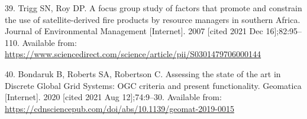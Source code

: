 \documentclass{josis}
\newlength{\cslhangindent}
\newenvironment{CSLReferences}[2] %
 {%
  \setlength{\parindent}{0pt}
  \ifodd #1 \everypar{\setlength{\hangindent}{\cslhangindent}}\ignorespaces\fi
  \ifnum #2 > 0
  \setlength{\parskip}{#2\baselineskip}
  \fi
 }%
 {}
\begin{document}
\begin{CSLReferences}{0}{0}
\leavevmode{}%
39. Trigg SN, Roy DP. A focus group study of factors that promote and constrain the use of satellite-derived fire products by resource managers in southern {Africa}. Journal of Environmental Management {[}Internet{]}. 2007 {[}cited 2021 Dec 16{]};82:95--110. Available from: \url{https://www.sciencedirect.com/science/article/pii/S0301479706000144}

\leavevmode{}%
40. Bondaruk B, Roberts SA, Robertson C. Assessing the state of the art in {Discrete} {Global} {Grid} {Systems}: {OGC} criteria and present functionality. Geomatica {[}Internet{]}. 2020 {[}cited 2021 Aug 12{]};74:9--30. Available from: \url{https://cdnsciencepub.com/doi/abs/10.1139/geomat-2019-0015}

\end{CSLReferences}



\end{document}

